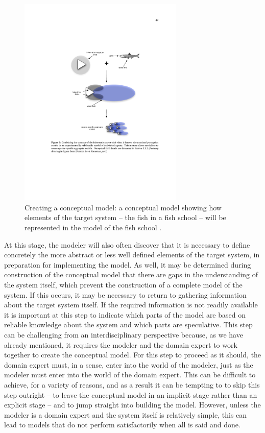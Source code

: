 \begin{figure}[!t]
	\centering
		\includegraphics[width=0.70\textwidth]{images/SIM/conceptualmodel3schellinck2011.pdf}
	\caption[\small Representing the fish school in the simulation]{\small Creating a conceptual model: a conceptual model showing how elements of the target system -- the fish in a fish school -- will be represented in the model of the fish school \cite{SIM_S}.}
	\label{simfig:6}
\end{figure}
\afterpage{\FloatBarrier}

At this stage, the modeler will also often discover that it is necessary to define concretely the more abstract or less well defined elements of the target system, in preparation for implementing the model. As well, it may be determined during construction of the conceptual model that there are gaps in the understanding of the system itself, which prevent the construction of a complete model of the system. If this occurs, it may be necessary to return to gathering information about the target system itself. If the required information is not readily available it is important at this step to indicate which parts of the model are based on reliable knowledge about the system and which parts are speculative.
\newpage\noindent This step can be challenging from an interdisciplinary perspective because, as we have already mentioned, it requires the modeler and the domain expert to work together to create the conceptual model. For this step to proceed as it should, the domain expert must, in a sense, enter into the world of the modeler, just as the modeler must enter into the world of the domain expert. This can be difficult to achieve, for a variety of reasons, and as a result it can be tempting to to skip this step outright -- to leave the conceptual model in an implicit stage rather than an explicit stage -- and to jump straight into building the model. However, unless the modeler is a domain expert and the system itself is relatively simple, this can lead to models that do not perform satisfactorily when all is said and done.

